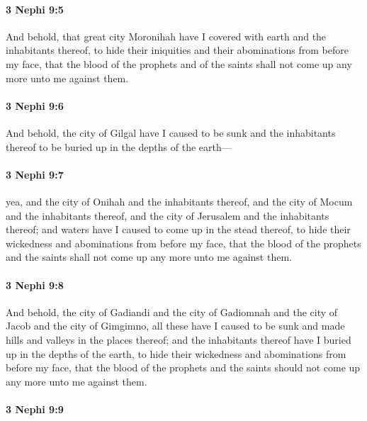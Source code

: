 		\paragraph{3 Nephi 9:5} %
			\label{3NEPHI-9-5}

			And behold, that great city Moronihah have I covered with earth
			and the inhabitants thereof,
			to hide their iniquities and their abominations from before my face,
			that the blood of the prophets and of the saints
			shall not come up any more unto me against them.

		\paragraph{3 Nephi 9:6} %
			\label{3NEPHI-9-6}

			And behold, the city of Gilgal have I caused to be sunk
			and the inhabitants thereof to be buried up in the depths of the earth---

		\paragraph{3 Nephi 9:7} %
			\label{3NEPHI-9-7}

			yea, and the city of Onihah and the inhabitants thereof,
			and the city of Mocum and the inhabitants thereof,
			and the city of Jerusalem and the inhabitants thereof;
			and waters have I caused to come up in the stead thereof,
			to hide their wickedness and abominations from before my face,
			that the blood of the prophets and the saints
			shall not come up any more unto me against them.

		\paragraph{3 Nephi 9:8} %
			\label{3NEPHI-9-8}

			And behold, the city of Gadiandi and the city of Gadiomnah
			and the city of Jacob and the city of Gimgimno,
			all these have I caused to be sunk
			and made hills and valleys in the places thereof;
			and the inhabitants thereof have I buried up in the depths of the earth,
			to hide their wickedness and abominations from before my face,
			that the blood of the prophets and the saints
			should not come up any more unto me against them.

		\paragraph{3 Nephi 9:9} %
			\label{3NEPHI-9-9}

